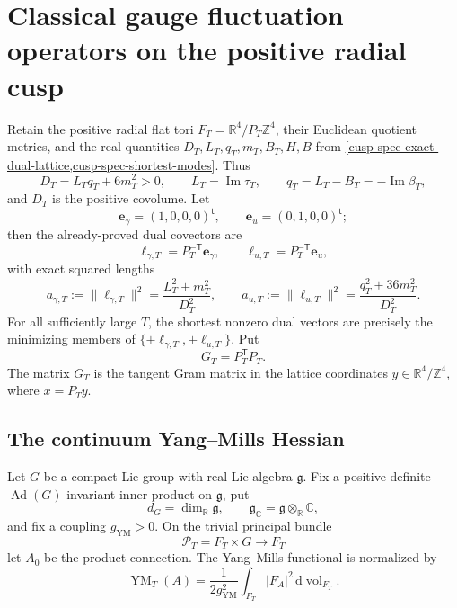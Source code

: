 \section{Classical gauge fluctuation operators on the positive radial cusp}
\label{cusp-gauge-section}

Retain the positive radial flat tori
\(F_T=\mathbb R^4/P_T\mathbb Z^4\), their Euclidean quotient metrics, and
the real quantities \(D_T,L_T,q_T,m_T,B_T,H,B\) from
\cref{cusp-spec-exact-dual-lattice,cusp-spec-shortest-modes}.  Thus
\[
 D_T=L_Tq_T+6m_T^2>0,\qquad
 L_T=\operatorname{Im}\tau_T,\qquad
 q_T=L_T-B_T=-\operatorname{Im}\beta_T,
\]
and \(D_T\) is the positive covolume.  Let
\[
 \mathbf e_\gamma=(1,0,0,0)^{\mathsf t},\qquad
 \mathbf e_u=(0,1,0,0)^{\mathsf t};
\]
then the already-proved dual covectors are
\[
 \ell_{\gamma,T}=P_T^{-\mathsf T}\mathbf e_\gamma,\qquad
 \ell_{u,T}=P_T^{-\mathsf T}\mathbf e_u,
\]
with exact squared lengths
\begin{equation}
 a_{\gamma,T}:=\lVert\ell_{\gamma,T}\rVert^2
 =\frac{L_T^2+m_T^2}{D_T^2},\qquad
 a_{u,T}:=\lVert\ell_{u,T}\rVert^2
 =\frac{q_T^2+36m_T^2}{D_T^2}.
 \label{cusp-gauge-short-mode-lengths}
\end{equation}
For all sufficiently large \(T\), the shortest nonzero dual vectors are
precisely the minimizing members of
\(\{\pm\ell_{\gamma,T},\pm\ell_{u,T}\}\).  Put
\begin{equation}
 G_T=P_T^{\mathsf T}P_T.
 \label{cusp-gauge-coordinate-gram}
\end{equation}
The matrix \(G_T\) is the tangent Gram matrix in the lattice coordinates
\(y\in\mathbb R^4/\mathbb Z^4\), where \(x=P_Ty\).

\subsection{The continuum Yang--Mills Hessian}
\label{cusp-gauge-continuum-subsection}

Let \(G\) be a compact Lie group with real Lie algebra \(\mathfrak g\).
Fix a positive-definite
\(\operatorname{Ad}(G)\)-invariant inner product on \(\mathfrak g\), put
\[
 d_G=\dim_{\mathbb R}\mathfrak g,\qquad
 \mathfrak g_{\mathbb C}=\mathfrak g\otimes_{\mathbb R}\mathbb C,
\]
and fix a coupling \(g_{\mathrm{YM}}>0\).  On the trivial principal bundle
\[
 \mathcal P_T=F_T\times G\longrightarrow F_T
\]
let \(A_0\) be the product connection.  The Yang--Mills functional is
normalized by
\begin{equation}
 \operatorname{YM}_T(A)
 =\frac1{2g_{\mathrm{YM}}^2}
 \int_{F_T}\lvert F_A\rvert^2\,\mathrm d\operatorname{vol}_{F_T}.
 \label{cusp-gauge-ym-normalization}
\end{equation}

